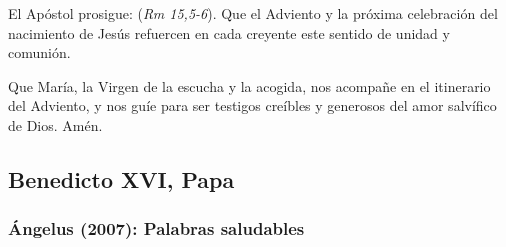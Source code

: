 \begin{body}
					El Apóstol prosigue:  (\emph{Rm 15,5-6}). Que el Adviento y la próxima celebración del nacimiento de Jesús refuercen en cada creyente este sentido de unidad y comunión. 
					
					Que María, la Virgen de la escucha y la acogida, nos acompañe en el itinerario del Adviento, y nos guíe para ser testigos creíbles y generosos del amor salvífico de Dios. Amén.
				\end{body}
			
\newsection 
			
		\subsection{Benedicto XVI, Papa}
		
			\subsubsection{Ángelus (2007): Palabras saludables}
			
				
